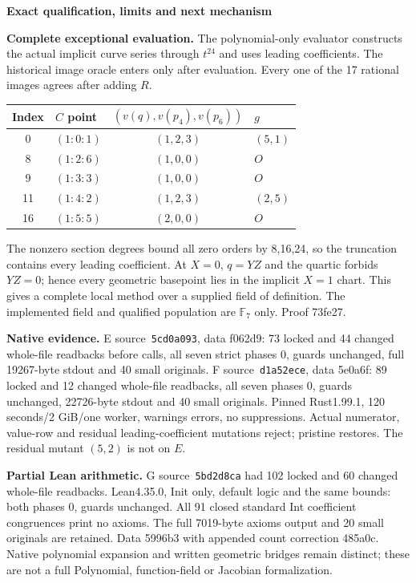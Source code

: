 \documentclass[10pt,a4paper]{article}
\begin{document}
\newpage
{\Large\bfseries Exact qualification, limits and next mechanism}\par

\textbf{Complete exceptional evaluation.} The polynomial-only evaluator
constructs the actual implicit curve series through $t^{24}$ and uses
leading coefficients. The historical image oracle enters only after
evaluation. Every one of the 17 rational images agrees after adding $R$.
\begin{center}
\begin{tabular}{clcl}
\toprule
Index & $C$ point & $(v(q),v(p_4),v(p_6))$ & $g$\\
\midrule
0 & $(1:0:1)$ & $(1,2,3)$ & $(5,1)$\\
8 & $(1:2:6)$ & $(1,0,0)$ & $O$\\
9 & $(1:3:3)$ & $(1,0,0)$ & $O$\\
11 & $(1:4:2)$ & $(1,2,3)$ & $(2,5)$\\
16 & $(1:5:5)$ & $(2,0,0)$ & $O$\\
\bottomrule
\end{tabular}
\end{center}
The nonzero section degrees bound all zero orders by 8,16,24, so the
truncation contains every leading coefficient. At $X=0$, $q=YZ$ and
the quartic forbids $YZ=0$; hence every geometric basepoint lies in
the implicit $X=1$ chart. This gives a complete local method over a
supplied field of definition. The implemented field and qualified
population are $\mathbb F_7$ only. Proof 73fe27.

\textbf{Native evidence.} E source~\texttt{5cd0a093}, data f062d9:
73 locked and 44 changed whole-file readbacks before calls, all seven
strict phases 0, guards unchanged, full 19267-byte stdout and 40 small
originals. F source~\texttt{d1a52ece}, data 5e0a6f: 89 locked and 12
changed whole-file readbacks, all seven phases 0, guards unchanged,
22726-byte stdout and 40 small originals. Pinned Rust1.99.1,
120 seconds/2 GiB/one worker, warnings errors, no suppressions.
Actual numerator, value-row and residual leading-coefficient mutations
reject; pristine restores. The residual mutant $(5,2)$ is not on $E$.

\textbf{Partial Lean arithmetic.} G source~\texttt{5bd2d8ca} had 102
locked and 60 changed whole-file readbacks. Lean4.35.0, Init only,
default logic and the same bounds: both phases 0, guards unchanged.
All 91 closed standard Int coefficient congruences print no axioms.
The full 7019-byte axioms output and 20 small originals are retained.
Data 5996b3 with appended count correction 485a0c. Native polynomial
expansion and written geometric bridges remain distinct; these are
not a full Polynomial, function-field or Jacobian formalization.
\end{document}
